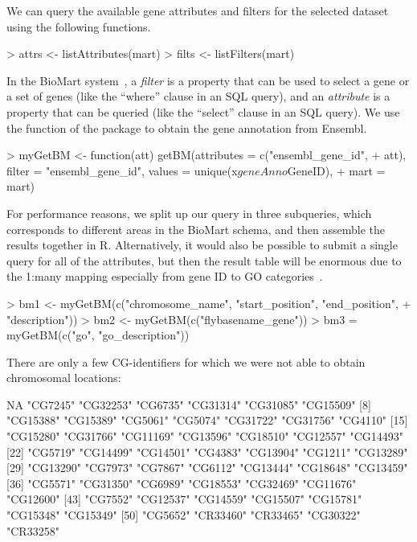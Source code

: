 % 
We can query the available gene attributes and filters for the
selected dataset using the following functions.
\begin{Schunk}
\begin{Sinput}
> attrs <- listAttributes(mart)
> filts <- listFilters(mart)
\end{Sinput}
\end{Schunk}
%
In the BioMart system~\cite{Kasprzyk2004}, a \emph{filter} is a
property that can be used to select a gene or a set of genes (like the
``where'' clause in an SQL query), and an \emph{attribute} is a
property that can be queried (like the ``select'' clause in an SQL
query). We use the  function of the package
 to obtain the gene annotation from Ensembl.
%
\begin{Schunk}
\begin{Sinput}
> myGetBM <- function(att) getBM(attributes = c("ensembl_gene_id", 
+     att), filter = "ensembl_gene_id", values = unique(x$geneAnno$GeneID), 
+     mart = mart)
\end{Sinput}
\end{Schunk}
% 
For performance reasons, we split up our query in three subqueries,
which corresponds to different areas in the BioMart schema, and then
assemble the results together in R.  Alternatively, it would also be
possible to submit a single query for all of the attributes, but then
the result table will be enormous due to the 1:many mapping
especially from gene ID to GO categories~\cite{GO}.
%
\begin{Schunk}
\begin{Sinput}
> bm1 <- myGetBM(c("chromosome_name", "start_position", "end_position", 
+     "description"))
> bm2 <- myGetBM(c("flybasename_gene"))
> bm3 = myGetBM(c("go", "go_description"))
\end{Sinput}
\end{Schunk}
%
There are only a few CG-identifiers for which we were not able to
obtain chromosomal locations: 
%
\begin{Schunk}
\begin{Soutput}
 [1] NA        "CG7245"  "CG32253" "CG6735"  "CG31314" "CG31085" "CG15509"
 [8] "CG15388" "CG15389" "CG5061"  "CG5074"  "CG31722" "CG31756" "CG4110" 
[15] "CG15280" "CG31766" "CG11169" "CG13596" "CG18510" "CG12557" "CG14493"
[22] "CG5719"  "CG14499" "CG14501" "CG4383"  "CG13904" "CG1211"  "CG13289"
[29] "CG13290" "CG7973"  "CG7867"  "CG6112"  "CG13444" "CG18648" "CG13459"
[36] "CG5571"  "CG31350" "CG6989"  "CG18553" "CG32469" "CG11676" "CG12600"
[43] "CG7552"  "CG12537" "CG14559" "CG15507" "CG15781" "CG15348" "CG15349"
[50] "CG5652"  "CR33460" "CR33465" "CG30322" "CR33258"
\end{Soutput}
\end{Schunk}
